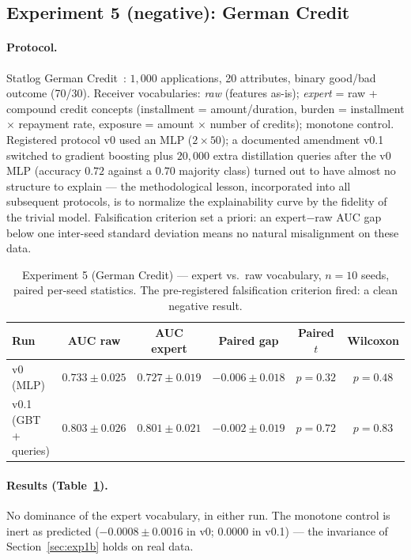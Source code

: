 \documentclass[10pt]{article}
\theoremstyle{definition}
\theoremstyle{plain}
\begin{document}
\subsection{Experiment 5 (negative): German Credit}
\label{sec:exp5}

\paragraph{Protocol.} Statlog German Credit~\citep{hofmann1994statlog}: $1{,}000$ applications, 20 attributes, binary good/bad outcome (70/30). Receiver vocabularies: \emph{raw} (features as-is); \emph{expert} = raw + compound credit concepts (installment = amount/duration, burden = installment $\times$ repayment rate, exposure = amount $\times$ number of credits); monotone control. Registered protocol v0 used an MLP ($2 \times 50$); a documented amendment v0.1 switched to gradient boosting plus $20{,}000$ extra distillation queries after the v0 MLP (accuracy $0.72$ against a $0.70$ majority class) turned out to have almost no structure to explain --- the methodological lesson, incorporated into all subsequent protocols, is to normalize the explainability curve by the fidelity of the trivial model. Falsification criterion set a priori: an expert$-$raw AUC gap below one inter-seed standard deviation means no natural misalignment on these data.

\begin{table}[t]
\centering
\footnotesize
\caption{Experiment 5 (German Credit) --- expert vs.\ raw vocabulary, $n = 10$ seeds, paired per-seed statistics. The pre-registered falsification criterion fired: a clean negative result.}
\label{tab:exp5}
\begin{tabular}{lccccc}
\toprule
Run & AUC raw & AUC expert & Paired gap & Paired $t$ & Wilcoxon \\
\midrule
v0 (MLP) & $0.733{\pm}0.025$ & $0.727{\pm}0.019$ & $-0.006{\pm}0.018$ & $p = 0.32$ & $p = 0.48$ \\
v0.1 (GBT + queries) & $0.803{\pm}0.026$ & $0.801{\pm}0.021$ & $-0.002{\pm}0.019$ & $p = 0.72$ & $p = 0.83$ \\
\bottomrule
\end{tabular}
\end{table}

\paragraph{Results (Table~\ref{tab:exp5}).} No dominance of the expert vocabulary, in either run. The monotone control is inert as predicted ($-0.0008 \pm 0.0016$ in v0; $0.0000$ in v0.1) --- the invariance of Section~\ref{sec:exp1b} holds on real data.
\end{document}
